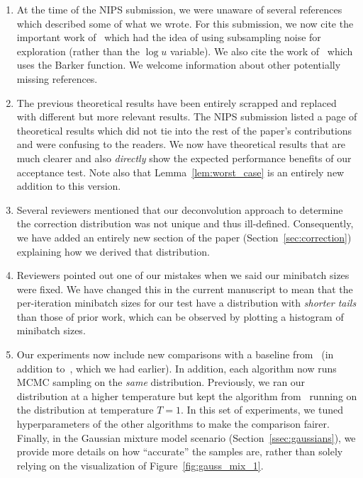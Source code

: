 \documentclass[twoside]{article} \usepackage{aistats2017}
\begin{document}
\begin{enumerate}
    \item At the time of the NIPS submission, we were unaware of several
    references which described some of what we wrote. For this submission, we
    now cite the important work of~\citep{TallData15} which had the idea of
    using subsampling noise for exploration (rather than the $\log u$ variable).
    We also cite the work of~\citep{Barker65} which uses the Barker function. We
    welcome information about other potentially missing references.

    \item The previous theoretical results have been entirely scrapped and
    replaced with different but more relevant results. The NIPS submission
    listed a page of theoretical results which did not tie into the rest of the
    paper's contributions and were confusing to the readers. We now have
    theoretical results that are much clearer and also \emph{directly} show the
    expected performance benefits of our acceptance test. Note also that
    Lemma~\ref{lem:worst_case} is an entirely new addition to this version.

    \item Several reviewers mentioned that our deconvolution approach to
    determine the correction distribution was not unique and thus ill-defined.
    Consequently, we have added an entirely new section of the paper
    (Section~\ref{sec:correction}) explaining how we derived that distribution.

    \item Reviewers pointed out one of our mistakes when we said our minibatch
    sizes were fixed. We have changed this in the current manuscript to mean
    that the per-iteration minibatch sizes for our test have a distribution with
    \emph{shorter tails} than those of prior work, which can be observed by
    plotting a histogram of minibatch sizes.

    \item Our experiments now include new comparisons with a baseline
    from~\citep{icml2014c1_bardenet14} (in addition to~\citep{cutting_mh_2014},
    which we had earlier). In addition, each algorithm now runs MCMC sampling on
    the \emph{same} distribution.  Previously, we ran our distribution at a
    higher temperature but kept the algorithm from~\citep{cutting_mh_2014}
    running on the distribution at temperature $T=1$. In this set of
    experiments, we tuned hyperparameters of the other algorithms to make the
    comparison fairer. Finally, in the Gaussian mixture model scenario
    (Section~\ref{ssec:gaussians}), we provide more details on how ``accurate''
    the samples are, rather than solely relying on the visualization of
    Figure~\ref{fig:gauss_mix_1}.


\end{enumerate}
\end{document}
